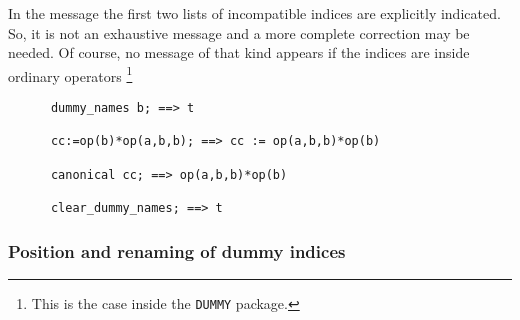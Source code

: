 In the message the first two lists of incompatible indices are 
explicitly indicated. So, it is not an exhaustive message and a more 
complete correction may be needed.
Of course, no message of that kind appears if the indices are inside 
ordinary operators%
\footnote{This is the case inside the \texttt{DUMMY} package.} 
\begin{verbatim}
      dummy_names b; ==> t

      cc:=op(b)*op(a,b,b); ==> cc := op(a,b,b)*op(b)

      canonical cc; ==> op(a,b,b)*op(b)    

      clear_dummy_names; ==> t
\end{verbatim}
\subsubsection{Position and renaming of dummy indices}

